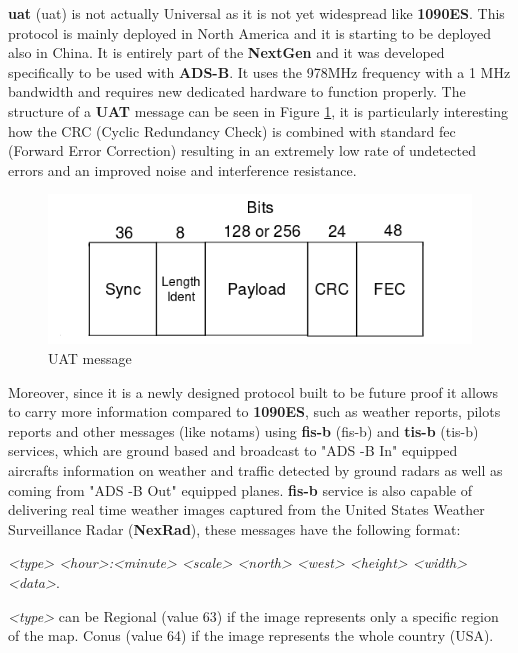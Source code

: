 \documentclass[../main.tex]{subfiles}
\begin{document}
\textbf{\acrshort{uat}} (\acrlong{uat}) is not actually Universal as it is not yet widespread like \textbf{1090ES}. This protocol is mainly deployed in North America and it is starting to be deployed also in China. It is entirely part of the \textbf{NextGen} and it was developed specifically to be used with \textbf{ADS-B}. It uses the 978MHz frequency with a 1 MHz bandwidth and requires new dedicated hardware to function properly. The structure of a \textbf{UAT} message can be seen in Figure \ref{fig:uatmsg}, it is particularly interesting how the CRC (Cyclic Redundancy Check) is combined with standard \acrshort{fec} (Forward Error Correction) resulting in an extremely low rate of undetected errors and an improved noise and interference resistance.

\begin{figure}[htp]
  \centering
  \includegraphics[scale=0.8]{images/uatmsg.png}
  \caption{UAT message}
  \label{fig:uatmsg}
\end{figure}

Moreover, since it is a newly designed protocol built to be future proof it allows to carry more information compared to \textbf{1090ES}, such as weather reports, pilots reports and other messages (like \acrshort{notam}s) using  \textbf{\acrshort{fis-b}} (\acrlong{fis-b}) and \textbf{\acrshort{tis-b}} (\acrlong{tis-b}) services, which are ground based and broadcast to "ADS -B In" equipped aircrafts information on weather and traffic detected by ground radars as well as coming from "ADS -B Out" equipped planes. \textbf{\acrshort{fis-b}} service is also capable of delivering real time weather images captured from the United States Weather Surveillance Radar (\textbf{NexRad}), these messages have the following format:

\emph{<type> <hour>:<minute> <scale> <north> <west> <height> <width> <data>}.

\medskip

\emph{<type>} can be Regional (value 63) if the image represents only a specific region of the map. Conus (value 64) if the image represents the whole country (USA).
\end{document}
